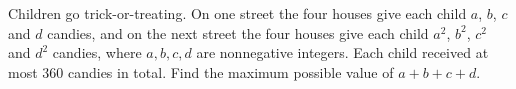 Children go trick-or-treating. On one street the four houses give each child $a$, $b$, $c$ and $d$ candies, and on the next street the four houses give each child $a^2$, $b^2$, $c^2$ and $d^2$ candies, where $a,b,c,d$ are nonnegative integers. Each child received at most $360$ candies in total. Find the maximum possible value of $a+b+c+d$.
